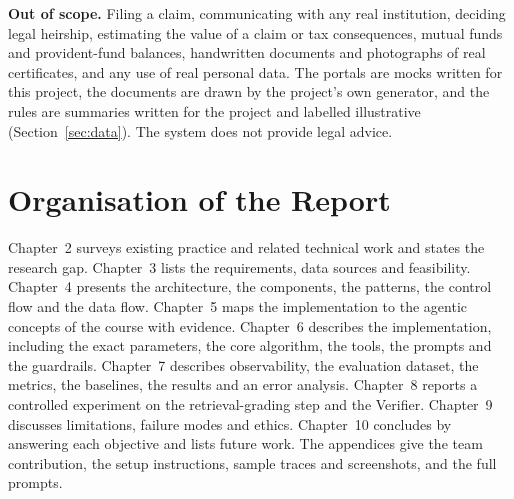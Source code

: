 \textbf{Out of scope.} Filing a claim, communicating with any real institution, deciding legal heirship, estimating the value of a claim or tax consequences, mutual funds and provident-fund balances, handwritten documents and photographs of real certificates, and any use of real personal data. The portals are mocks written for this project, the documents are drawn by the project's own generator, and the rules are summaries written for the project and labelled illustrative (Section~\ref{sec:data}). The system does not provide legal advice.

\section{Organisation of the Report}
Chapter~2 surveys existing practice and related technical work and states the research gap. Chapter~3 lists the requirements, data sources and feasibility. Chapter~4 presents the architecture, the components, the patterns, the control flow and the data flow. Chapter~5 maps the implementation to the agentic concepts of the course with evidence. Chapter~6 describes the implementation, including the exact parameters, the core algorithm, the tools, the prompts and the guardrails. Chapter~7 describes observability, the evaluation dataset, the metrics, the baselines, the results and an error analysis. Chapter~8 reports a controlled experiment on the retrieval-grading step and the Verifier. Chapter~9 discusses limitations, failure modes and ethics. Chapter~10 concludes by answering each objective and lists future work. The appendices give the team contribution, the setup instructions, sample traces and screenshots, and the full prompts.
